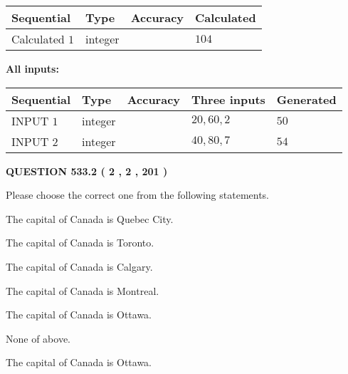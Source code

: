 \documentclass[12pt]{article}
\begin{document}
   
  
  
\noindent\begin{tabular}{|l|l|l|l|}
\hline
 Sequential & Type & Accuracy & Calculated \\ 
\hline
 
 
  Calculated $  1 $ & integer &  & 
  $ 104 $ 
 \\  \hline  
 \end{tabular}
   
   
   
   
\noindent\vspace{0.1in}\hspace{-0.08in} {\textbf{\Large{All inputs: }}}
   
   
  
  
\noindent\begin{tabular}{|l|l|l|l|l|}
\hline
 Sequential & Type & Accuracy & Three inputs & Generated \\ 
\hline
 
 
  INPUT $  1 $ & integer &  & $
 20
 , 
 60
 , 
 2
 $ & $ 50 $ 
 \\  \hline  
 
 
  INPUT $  2 $ & integer &  & $
 40
 , 
 80
 , 
 7
 $ & $ 54 $ 
 \\  \hline  
 \end{tabular}
   
   
  
\vspace{0.2in}
  
{\textbf{\Large{QUESTION
533.2 
 ( 2 , 2 , 201 )
}}}
  
  
Please choose the correct one from the following statements.
 
 
The capital of Canada is Quebec City.
 
 
The capital of Canada is Toronto.
 
 
The capital of Canada is Calgary.
 
 
The capital of Canada is Montreal.
 
 
The capital of Canada is Ottawa.
 
 
 None of above.
 
 
\noindent{}
 
 
The capital of Canada is Ottawa.
 
\end{document}
